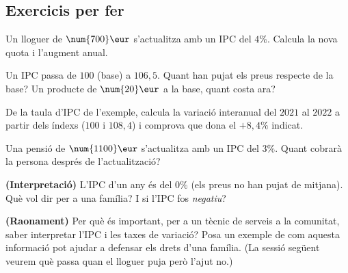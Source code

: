 \subsection{Exercicis per fer}

\begin{exercicis}
\begin{exlist}
  \item Un lloguer de $\num{700}\eur$ s'actualitza amb un IPC del $4\%$. Calcula la
        nova quota i l'augment anual.
  \item Un IPC passa de $100$ (base) a $106,5$. Quant han pujat els preus respecte de
        la base? Un producte de $\num{20}\eur$ a la base, quant costa ara?
  \item De la taula d'IPC de l'exemple, calcula la variació interanual del $2021$ al
        $2022$ a partir dels índexs ($100$ i $108,4$) i comprova que dona el $+8,4\%$
        indicat.
  \item Una pensió de $\num{1100}\eur$ s'actualitza amb un IPC del $3\%$. Quant cobrarà
        la persona després de l'actualització?
  \item \textbf{(Interpretació)} L'IPC d'un any és del $0\%$ (els preus no han pujat de
        mitjana). Què vol dir per a una família? I si l'IPC fos \emph{negatiu}?
  \item \textbf{(Raonament)} Per què és important, per a un tècnic de serveis a la
        comunitat, saber interpretar l'IPC i les taxes de variació? Posa un exemple de
        com aquesta informació pot ajudar a defensar els drets d'una família. (La
        sessió següent veurem què passa quan el lloguer puja però l'ajut no.)
\end{exlist}
\end{exercicis}

